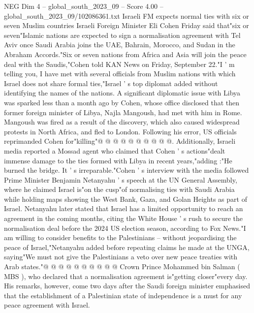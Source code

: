 \begin{textsample}{NEG Dim 4 – global\_south\_2023\_09 – Score 4.00 – global\_south\_2023\_09/102086361.txt}  \label{ex:f4_neg_037}
Israeli FM expects normal ties with six or seven Muslim countries Israeli Foreign Minister Eli Cohen Friday said that"six or seven"Islamic nations are expected to sign a normalisation agreement with Tel Aviv once Saudi Arabia joins the UAE, Bahrain, Morocco, and Sudan in the Abraham Accords."Six or seven nations from Africa and Asia will join the peace deal with the Saudis,"Cohen told KAN News on Friday, September 22."I ' m telling you, I have met with several officials from Muslim nations with which Israel does not share formal ties,"Israel ' s top diplomat added without identifying the names of the nations.
A significant diplomatic issue with Libya was sparked less than a month ago by Cohen, whose office disclosed that then former foreign minister of Libya, Najla Mangoush, had met with him in Rome.
Mangoush was fired as a result of the discovery, which also caused widespread protests in North Africa, and fled to London.
Following his error, US officials reprimanded Cohen for"killing"@ @ @ @ @ @ @ @ @ @.
Additionally, Israeli media reported a Mossad agent who claimed that Cohen ' s actions"dealt immense damage to the ties formed with Libya in recent years,"adding :"He burned the bridge.
It ' s irreparable."Cohen ' s interview with the media followed Prime Minister Benjamin Netanyahu ' s speech at the UN General Assembly, where he claimed Israel is"on the cusp"of normalising ties with Saudi Arabia while holding maps showing the West Bank, Gaza, and Golan Heights as part of Israel.
Netanyahu later stated that Israel has a limited opportunity to reach an agreement in the coming months, citing the White House ' s rush to secure the normalisation deal before the 2024 US election season, according to Fox News."I am willing to consider benefits to the Palestinians -- without jeopardising the peace of Israel,"Netanyahu added before repeating claims he made at the UNGA, saying"We must not give the Palestinians a veto over new peace treaties with Arab states."@ @ @ @ @ @ @ @ @ @ Crown Prince Mohammed bin Salman ( MBS ), who declared that a normalisation agreement is"getting closer"every day.
His remarks, however, come two days after the Saudi foreign minister emphasised that the establishment of a Palestinian state of independence is a must for any peace agreement with Israel.

\end{textsample}
